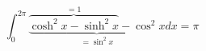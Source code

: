 \documentclass{book}
\begin{document}
\begin{equation*}
\int_0^{2\pi}\underbrace{\overbrace{\cosh^2x
-\sinh^2x}^{=1}-\cos^2x}_{=\sin^2 x}dx=\pi
\end{equation*}
\end{document}
